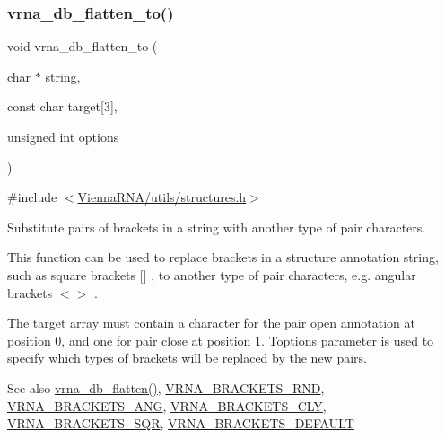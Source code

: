 \subsubsection{\texorpdfstring{vrna\+\_\+db\+\_\+flatten\+\_\+to()}{vrna\_db\_flatten\_to()}}
{\footnotesize\ttfamily void vrna\+\_\+db\+\_\+flatten\+\_\+to (\begin{DoxyParamCaption}\item[{char $\ast$}]{string,  }\item[{const char}]{target\mbox{[}3\mbox{]},  }\item[{unsigned int}]{options }\end{DoxyParamCaption})}



{\ttfamily \#include $<$\hyperlink{utils_2structures_8h}{Vienna\+R\+N\+A/utils/structures.\+h}$>$}



Substitute pairs of brackets in a string with another type of pair characters. 

This function can be used to replace brackets in a structure annotation string, such as square brackets {\ttfamily }\mbox{[}\mbox{]} , to another type of pair characters, e.\+g. angular brackets {\ttfamily $<$$>$} .

The {\ttfamily target} array must contain a character for the \textquotesingle{}pair open\textquotesingle{} annotation at position 0, and one for \textquotesingle{}pair close\textquotesingle{} at position 1. T{\ttfamily options} parameter is used to specify which types of brackets will be replaced by the new pairs.

\begin{DoxySeeAlso}{See also}
\hyperlink{group__struct__utils__dot__bracket_gae966b9f44168a4f4b39ca42ffb5f37b7}{vrna\+\_\+db\+\_\+flatten()}, \hyperlink{group__struct__utils__dot__bracket_gac92d5fa7c6625bce2670ece510a24fbd}{V\+R\+N\+A\+\_\+\+B\+R\+A\+C\+K\+E\+T\+S\+\_\+\+R\+ND}, \hyperlink{group__struct__utils__dot__bracket_ga863e03f7f73f10fc9bbcbefbdda4bec8}{V\+R\+N\+A\+\_\+\+B\+R\+A\+C\+K\+E\+T\+S\+\_\+\+A\+NG}, \hyperlink{group__struct__utils__dot__bracket_gaf41be40e79cb756c4e0bb8edb4d803d2}{V\+R\+N\+A\+\_\+\+B\+R\+A\+C\+K\+E\+T\+S\+\_\+\+C\+LY}, \hyperlink{group__struct__utils__dot__bracket_ga60525d61d7496eeea490a37f3d6bf757}{V\+R\+N\+A\+\_\+\+B\+R\+A\+C\+K\+E\+T\+S\+\_\+\+S\+QR}, \hyperlink{group__struct__utils__dot__bracket_ga559ebf76b1b289f85309f4206e99aa1a}{V\+R\+N\+A\+\_\+\+B\+R\+A\+C\+K\+E\+T\+S\+\_\+\+D\+E\+F\+A\+U\+LT}
\end{DoxySeeAlso}

